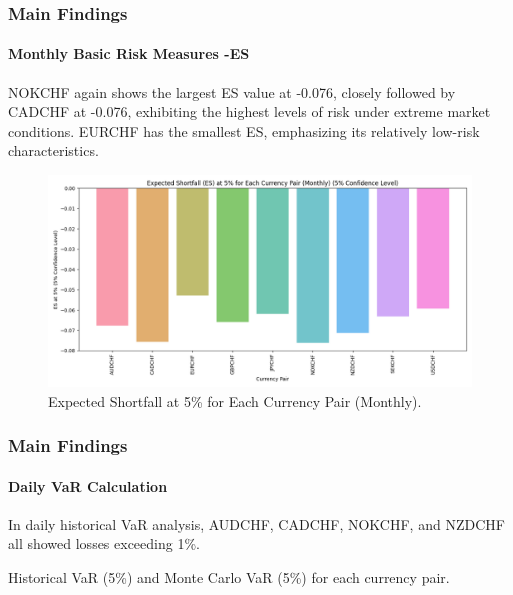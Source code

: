\documentclass[10pt]{beamer}
\begin{document}
\begin{frame}
\frametitle{Main Findings}
\framesubtitle{Monthly Basic Risk Measures -ES}
NOKCHF again shows the largest ES value at -0.076, closely followed by CADCHF at -0.076, exhibiting the highest levels of risk under extreme market conditions. EURCHF has the smallest ES, emphasizing its relatively low-risk characteristics.
\begin{figure}[h]
    \centering   \includegraphics[width=0.9\linewidth]{../../reports/figures/ES_5_percent_plot.png}
    \caption{\footnotesize Expected Shortfall at 5\% for Each Currency Pair (Monthly).}
    \label{fig:month_es_plot}
\end{figure}
\end{frame}
\begin{frame}
\frametitle{Main Findings}
\framesubtitle{Daily VaR Calculation}
In daily historical VaR analysis, AUDCHF, CADCHF, NOKCHF, and NZDCHF all showed losses exceeding 1\%. 
\begin{table}[h]
\centering
\caption{\footnotesize Historical VaR (5\%) and Monte Carlo VaR (5\%) for each currency pair.} 
\label{tab:var_results}
\end{table}
\end{frame}
\end{document}
